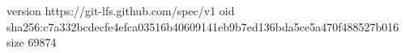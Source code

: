 version https://git-lfs.github.com/spec/v1
oid sha256:c7a332bcdecfe4efca03516b40609141eb9b7ed136bda5ce5a470f488527b016
size 69874
